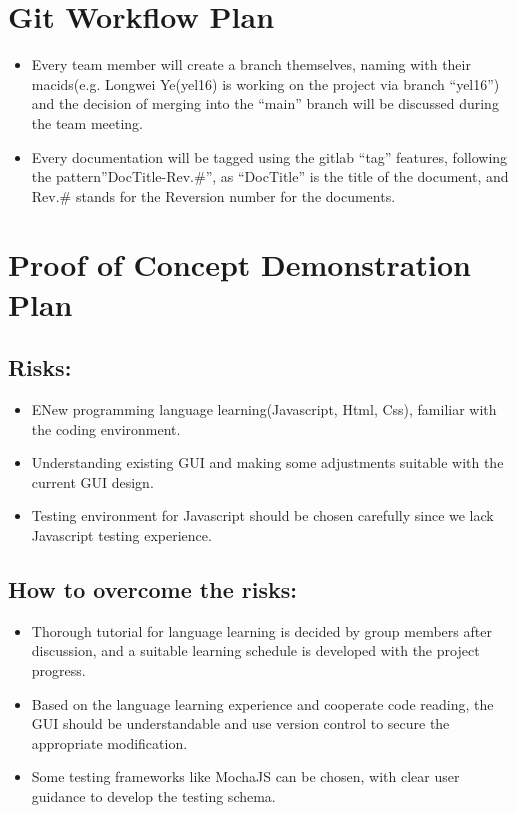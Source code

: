 \documentclass[11pt, letterpaper]{article}
\begin{document}
\section{Git Workflow Plan}
\begin{itemize}
	\item Every team member will create a branch themselves, naming with their macids(e.g. Longwei Ye(yel16) is working on the project via branch “yel16”) and the decision of merging into the “main” branch will be discussed during the team meeting.
	\item Every documentation will be tagged using the gitlab “tag” features, following the pattern”DocTitle-Rev.\#”, as “DocTitle” is the title of the document, and Rev.\# stands for the Reversion number for the documents.
\end{itemize}

\section{Proof of Concept Demonstration Plan}
	\subsection {Risks:}
		\begin{itemize}
			\item ENew programming language learning(Javascript, Html, Css), familiar with the coding environment.
			\item Understanding existing GUI and making some adjustments suitable with the current GUI design.
			\item Testing environment for Javascript should be chosen carefully since we lack Javascript testing experience.
		\end{itemize}
	\subsection {How to overcome the risks:}
		\begin{itemize}
			\item Thorough tutorial for language learning is decided by group members after discussion, and a suitable learning schedule is developed with the project progress.
			\item Based on the language learning experience and cooperate code reading, the GUI should be understandable and use version control to secure the appropriate modification.
			\item Some testing frameworks like MochaJS can be chosen, with clear user guidance to develop the testing schema.
		\end{itemize}
\end{document}
